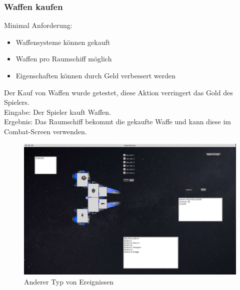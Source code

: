 \documentclass[12pt]{article}
\begin{document}
\subsubsection{Waffen kaufen}
Minimal Anforderung: 
\begin{itemize}
\item Waffensysteme können gekauft
\item Waffen pro Raumschiff möglich
\item Eigenschaften können durch Geld verbessert werden
\end{itemize} 
Der Kauf von Waffen wurde getestet, diese Aktion verringert das Gold des Spielers.\\
Eingabe: Der Spieler kauft Waffen.\\
Ergebnis: Das Raumschiff bekommt die gekaufte Waffe und kann diese im Combat-Screen verwenden.
\begin{figure}[htp]
\centering
\includegraphics[scale=0.4]{TestProtocolBilder/weaponkaufen.jpg}
\caption{Anderer Typ von Ereignissen}
\end{figure}
\newpage
\end{document}
